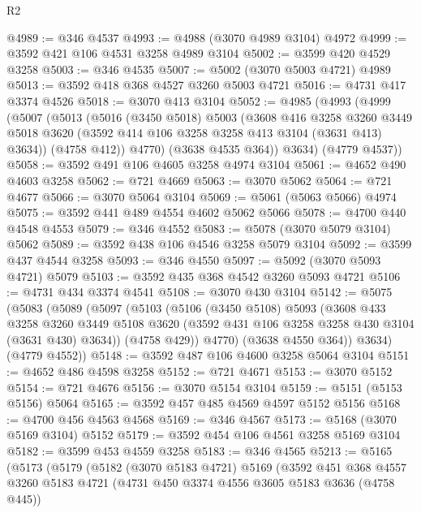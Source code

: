 \begin{lexlean}{R2}
\begin{coremodule}
@4989 := @346 @4537
@4993 := @4988 (@3070 @4989 @3104) @4972
@4999 := @3592 @421 @106 @4531 @3258 @4989 @3104
@5002 := @3599 @420 @4529 @3258
@5003 := @346 @4535
@5007 := @5002 (@3070 @5003 @4721) @4989
@5013 := @3592 @418 @368 @4527 @3260 @5003 @4721
@5016 := @4731 @417 @3374 @4526
@5018 := @3070 @413 @3104
@5052 := @4985
    (@4993
      (@4999
        (@5007
          (@5013
            (@5016
              (@3450 @5018)
              @5003
              (@3608
                @416
                @3258
                @3260
                @3449
                @5018
                @3620
                (@3592 @414 @106 @3258 @3258 @413 @3104 (@3631 @413) @3634))
              (@4758 @412))
            @4770)
          (@3638 @4535 @364))
        @3634)
      (@4779 @4537))
@5058 := @3592 @491 @106 @4605 @3258 @4974 @3104
@5061 := @4652 @490 @4603 @3258
@5062 := @721 @4669
@5063 := @3070 @5062
@5064 := @721 @4677
@5066 := @3070 @5064 @3104
@5069 := @5061 (@5063 @5066) @4974
@5075 := @3592 @441 @489 @4554 @4602 @5062 @5066
@5078 := @4700 @440 @4548 @4553
@5079 := @346 @4552
@5083 := @5078 (@3070 @5079 @3104) @5062
@5089 := @3592 @438 @106 @4546 @3258 @5079 @3104
@5092 := @3599 @437 @4544 @3258
@5093 := @346 @4550
@5097 := @5092 (@3070 @5093 @4721) @5079
@5103 := @3592 @435 @368 @4542 @3260 @5093 @4721
@5106 := @4731 @434 @3374 @4541
@5108 := @3070 @430 @3104
@5142 := @5075
    (@5083
      (@5089
        (@5097
          (@5103
            (@5106
              (@3450 @5108)
              @5093
              (@3608
                @433
                @3258
                @3260
                @3449
                @5108
                @3620
                (@3592 @431 @106 @3258 @3258 @430 @3104 (@3631 @430) @3634))
              (@4758 @429))
            @4770)
          (@3638 @4550 @364))
        @3634)
      (@4779 @4552))
@5148 := @3592 @487 @106 @4600 @3258 @5064 @3104
@5151 := @4652 @486 @4598 @3258
@5152 := @721 @4671
@5153 := @3070 @5152
@5154 := @721 @4676
@5156 := @3070 @5154 @3104
@5159 := @5151 (@5153 @5156) @5064
@5165 := @3592 @457 @485 @4569 @4597 @5152 @5156
@5168 := @4700 @456 @4563 @4568
@5169 := @346 @4567
@5173 := @5168 (@3070 @5169 @3104) @5152
@5179 := @3592 @454 @106 @4561 @3258 @5169 @3104
@5182 := @3599 @453 @4559 @3258
@5183 := @346 @4565
@5213 := @5165
    (@5173
      (@5179
        (@5182
          (@3070 @5183 @4721)
          @5169
          (@3592
            @451
            @368
            @4557
            @3260
            @5183
            @4721
            (@4731 @450 @3374 @4556 @3605 @5183 @3636 (@4758 @445))

\end{coremodule}
\end{lexlean}
